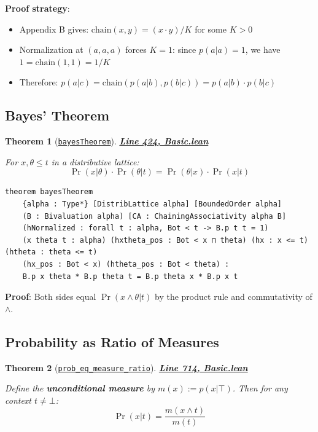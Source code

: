 \documentclass[11pt]{article}
\newtheorem{theorem}{Theorem}[section]
\theoremstyle{definition}
\theoremstyle{remark}
\begin{document}
\textbf{Proof strategy}:
\begin{itemize}
\item Appendix B gives: $\text{chain}(x,y) = (x \cdot y)/K$ for some $K > 0$
\item Normalization at $(a,a,a)$ forces $K = 1$: since $p(a|a) = 1$, we have $1 = \text{chain}(1, 1) = 1/K$
\item Therefore: $p(a|c) = \text{chain}(p(a|b), p(b|c)) = p(a|b) \cdot p(b|c)$
\end{itemize}

\subsection{Bayes' Theorem}

\begin{theorem}[\href{https://github.com/zariuq/ks-foundations-of-inference/blob/main/KnuthSkilling/Probability/ConditionalProbability/Basic.lean\#L424}{\texttt{bayesTheorem}}]
\textbf{\href{https://github.com/zariuq/ks-foundations-of-inference/blob/main/KnuthSkilling/Probability/ConditionalProbability/Basic.lean\#L424}{Line 424, Basic.lean}}

For $x, \theta \leq t$ in a distributive lattice:
\[ \Pr(x|\theta) \cdot \Pr(\theta|t) = \Pr(\theta|x) \cdot \Pr(x|t) \]
\end{theorem}

\begin{lstlisting}[caption={\texttt{bayesTheorem} (\href{https://github.com/zariuq/ks-foundations-of-inference/blob/main/KnuthSkilling/Probability/ConditionalProbability/Basic.lean\#L424}{Basic.lean:424})},numbers=none]
theorem bayesTheorem
    {alpha : Type*} [DistribLattice alpha] [BoundedOrder alpha]
    (B : Bivaluation alpha) [CA : ChainingAssociativity alpha B]
    (hNormalized : forall t : alpha, Bot < t -> B.p t t = 1)
    (x theta t : alpha) (hxtheta_pos : Bot < x ⊓ theta) (hx : x <= t) (htheta : theta <= t)
    (hx_pos : Bot < x) (htheta_pos : Bot < theta) :
    B.p x theta * B.p theta t = B.p theta x * B.p x t
\end{lstlisting}

\textbf{Proof}: Both sides equal $\Pr(x \wedge \theta | t)$ by the product rule and commutativity of $\wedge$.

\subsection{Probability as Ratio of Measures}

\begin{theorem}[\href{https://github.com/zariuq/ks-foundations-of-inference/blob/main/KnuthSkilling/Probability/ConditionalProbability/Basic.lean\#L714}{\texttt{prob\_eq\_measure\_ratio}}]
\textbf{\href{https://github.com/zariuq/ks-foundations-of-inference/blob/main/KnuthSkilling/Probability/ConditionalProbability/Basic.lean\#L714}{Line 714, Basic.lean}}

Define the \textbf{unconditional measure} by $m(x) := p(x|\top)$. Then for any context $t \neq \bot$:
\[ \Pr(x|t) = \frac{m(x \wedge t)}{m(t)} \]
\end{theorem}
\end{document}
